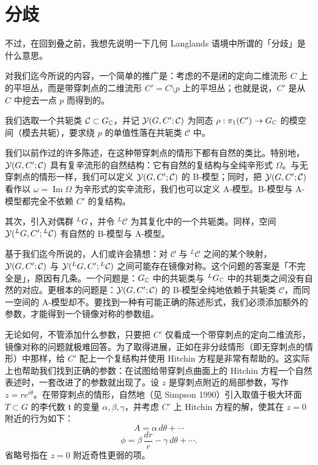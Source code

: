 \section{分歧}

不过，在回到叠之前，我想先说明一下几何 Langlands 语境中所谓的「分歧」是什么意思。

对我们迄今所说的内容，一个简单的推广是：考虑的不是闭的定向二维流形 $C$ 上的平坦丛，而是带穿刺点的二维流形 $C'=C\setminus p$ 上的平坦丛；也就是说，$C'$ 是从 $C$ 中挖去一点 $p$ 而得到的。

我们选取一个共轭类 $\mathcal{C}\subset G_{\mathbb{C}}$，并记 $\mathcal{Y}(G,C';\mathcal{C})$ 为同态 $\rho:\pi_{1}(C')\to G_{\mathbb{C}}$ 的模空间（模去共轭），要求绕 $p$ 的单值性落在共轭类 $\mathcal{C}$ 中。

我们以前作过的许多陈述，在这种带穿刺点的情形下都有自然的类比。特别地，$\mathcal{Y}(G,C';\mathcal{C})$ 具有复辛流形的自然结构：它有自然的复结构与全纯辛形式 $\Omega$。与无穿刺点的情形一样，我们可以定义 $\mathcal{Y}(G,C';\mathcal{C})$ 的 B-模型；同时，把 $\mathcal{Y}(G,C';\mathcal{C})$ 看作以 $\omega=\operatorname{Im}\Omega$ 为辛形式的实辛流形，我们也可以定义 A-模型。B-模型与 A-模型都完全不依赖 $C'$ 的复结构。

其次，引入对偶群 ${}^{L}G$，并令 ${}^{L}\mathcal{C}$ 为其复化中的一个共轭类。同样，空间 $\mathcal{Y}({}^{L}G,C';{}^{L}\mathcal{C})$ 有自然的 B-模型与 A-模型。

基于我们迄今所说的，人们或许会猜想：对 $\mathcal{C}$ 与 ${}^{L}\mathcal{C}$ 之间的某个映射，$\mathcal{Y}(G,C';\mathcal{C})$ 与 $\mathcal{Y}({}^{L}G,C';{}^{L}\mathcal{C})$ 之间可能存在镜像对称。这个问题的答案是「不完全是」，原因有几条。一个问题是：$G_{\mathbb{C}}$ 中的共轭类与 ${}^{L}G_{\mathbb{C}}$ 中的共轭类之间没有自然的对应。更根本的问题是：$\mathcal{Y}(G,C';\mathcal{C})$ 的 B-模型全纯地依赖于共轭类 $\mathcal{C}$，而同一空间的 A-模型却不。要找到一种有可能正确的陈述形式，我们必须添加额外的参数，才能得到一个镜像对称的参数组。

无论如何，不管添加什么参数，只要把 $C'$ 仅看成一个带穿刺点的定向二维流形，镜像对称的问题就极难回答。为了取得进展，正如在非分歧情形（即无穿刺点的情形）中那样，给 $C'$ 配上一个复结构并使用 Hitchin 方程是非常有帮助的。这实际上也帮助我们找到正确的参数：在试图给带穿刺点曲面上的 Hitchin 方程一个自然表述时，一套改进了的参数就出现了。设 $z$ 是穿刺点附近的局部参数，写作 $z=re^{i\theta}$。在带穿刺点的情形，自然地（见 Simpson 1990）引入取值于极大环面 $T\subset G$ 的李代数 $\mathfrak{t}$ 的变量 $\alpha,\beta,\gamma$，并考虑 $C'$ 上 Hitchin 方程的解，使其在 $z=0$ 附近的行为如下：
\begin{equation}
A=\alpha\,d\theta+\cdots
\label{eq:A-asym}
\end{equation}
\begin{equation}
\phi=\beta\,\frac{dr}{r}-\gamma\,d\theta+\cdots.
\label{eq:phi-asym}
\end{equation}
省略号指在 $z=0$ 附近奇性更弱的项。

